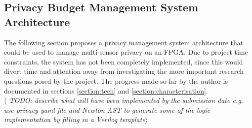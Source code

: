 \documentclass[12pt]{article}
\begin{document}
  \subsection{Privacy Budget Management System Architecture} \label{subsection:privacy_budget_system_arch}
    The following section proposes a privacy management system architecture that could be used to manage multi-sensor privacy on an FPGA. Due to project time constraints, the system has not been completely implemented, since this would divert time and attention away from investigating the more important research questions posed by the project. The progress made so far by the author is documented in sections \ref{section:tech} and \ref{section:characterisation}.
    \\

    \textit{$\langle$ TODO: describe what will have been implemented by the submission date e.g. use privacy yaml file and Newton AST to generate some of the logic implementation by filling in a Verilog template$\rangle$}
    \\
    
\end{document}
